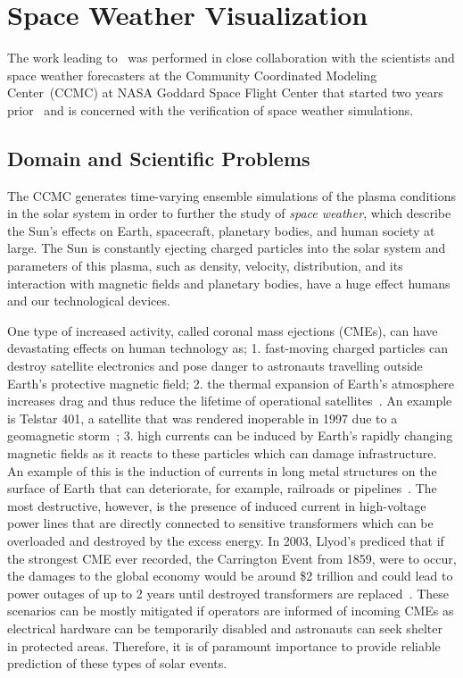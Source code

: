 \section{Space Weather Visualization} \label{contributions:spaceweather}
The work leading to \paperCME\ was performed in close collaboration with the scientists and space weather forecasters at the Community Coordinated Modeling Center~(CCMC) at NASA Goddard Space Flight Center that started two years prior~\cite{tornros2013interactive, bock14vcmass} and is concerned with the verification of space weather simulations.


\subsection{Domain and Scientific Problems} \label{contributions:astro:spaceweather:background}
The CCMC generates time-varying ensemble simulations of the plasma conditions in the solar system in order to further the study of \emph{space weather}, which describe the Sun's effects on Earth, spacecraft, planetary bodies, and human society at large.  The Sun is constantly ejecting charged particles into the solar system and parameters of this plasma, such as density, velocity, distribution, and its interaction with magnetic fields and planetary bodies, have a huge effect humans and our technological devices.

One type of increased activity, called coronal mass ejections (CMEs), can have devastating effects on human technology as;  1. fast-moving charged particles can destroy satellite electronics and pose danger to astronauts travelling outside Earth's protective magnetic field;  2. the thermal expansion of Earth's atmosphere increases drag and thus reduce the lifetime of operational satellites~\cite{knowles2001effect}.  An example is Telstar 401, a satellite that was rendered inoperable in 1997 due to a geomagnetic storm~\cite{sabol1998analysis};  3. high currents can be induced by Earth's rapidly changing magnetic fields as it reacts to these particles which can damage infrastructure.  An example of this is the induction of currents in long metal structures on the surface of Earth that can deteriorate, for example, railroads or pipelines~\cite{pirjola1999power}.  The most destructive, however, is the presence of induced current in high-voltage power lines that are directly connected to sensitive transformers which can be overloaded and destroyed by the excess energy.  In 2003, Llyod's prediced that if the strongest CME ever recorded, the Carrington Event from 1859, were to occur, the damages to the global economy would be around \$2 trillion and could lead to power outages of up to 2 years until destroyed transformers are replaced~\cite{maynard2013solar}.  These scenarios can be mostly mitigated if operators are informed of incoming CMEs as electrical hardware can be temporarily disabled and astronauts can seek shelter in protected areas.  Therefore, it is of paramount importance to provide reliable prediction of these types of solar events.


